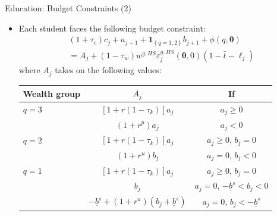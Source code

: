 \documentclass{beamer}
\begin{document}
\begin{frame}{Education: Budget Constraints (2)}
\begin{itemize}
  \item Each student faces the following budget constraint:
  		\begin{equation*}
  		\begin{aligned}
        (1+\tau_c)c_j+a_{j+1}+\textbf{1}_{\left\{q=1,2\right\}}b_{j+1} + \phi(q,\boldsymbol{\theta})	\\				
        = A_j + (1-\tau_w)w^{g,HS}				\varepsilon^{g,HS}_j(\boldsymbol{\theta},0) (1-\bar{t}-\ell_j)
        \end{aligned}
        \end{equation*}
        where $A_j$ takes on the following values:
\begin{table}[H]
\begin{center}
  \begin{tabular}{ l | c | c}
      \hline
     Wealth group & $A_j$ & If  \\ \hline
     $q=3$ & $[1+r(1-\tau_k)]a_j$ & $a_j\geq0$  \\ 
     & $(1+r^p)a_j$ & $a_j<0$  \\ \hline
     $q=2$ & $[1+r(1-\tau_k)]a_j$ & $a_j\geq0$, $b_j=0$ \\ 
     & $(1+r^u)b_j$ & $a_j=0$, $b_j<0$  \\ \hline
     $q=1$ & $[1+r(1-\tau_k)]a_j$ & $a_j\geq0$, $b_j=0$ \\ 
     & $b_j$ & $a_j=0$, $-\underline{b}^s<b_j<0$  \\ 
     & $-\underline{b}^s+(1+r^u)(b_j+\underline{b}^s)$ & $a_j=0$, $b_j<-\underline{b}^s$	\\ 
      \hline
  \end{tabular}
\end{center}
\end {table}
\end{itemize}      
\end{frame} 
\end{document}

